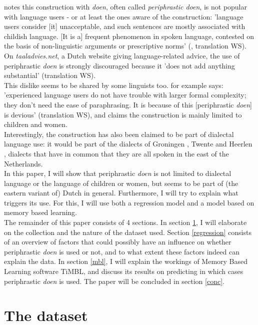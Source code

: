 \documentclass[12pt]{article}
\begin{document}
\citet{g83} notes this construction with \emph{doen}, often called \emph{periphrastic doen}, is not popular with language users - or at least the ones aware of the construction: 'language users consider [it] unacceptable, and such sentences are mostly associated with childish language. [It is a] frequent phenomenon in spoken language, contested on the basis of non-linguistic arguments or prescriptive norms' (\citealp[p. 58]{g83}, translation WS). On \emph{taaladvies.net}, a Dutch website giving language-related advice, the use of periphrastic \emph{doen} is strongly discouraged because it 'does not add anything substantial' (translation WS).\\\indent
This dislike seems to be shared by some linguists too. \citet[p. 121]{d94} for example says: 'experienced language users do not have trouble with larger formal complexity; they don't need the ease of paraphrasing. It is because of this [periphrastic \emph{doen}] is devious' (translation WS), and \citet[p. 153]{n62} claims the construction is mainly limited to children and women.\\\indent
Interestingly, the construction has also been claimed to be part of dialectal language use: it would be part of the dialects of Groningen \citep{tl53}, Twente \citep{n62} and Heerlen \citep{c94}, dialects that have in common that they are all spoken in the east of the Netherlands.\\\indent
In this paper, I will show that periphrastic \emph{doen} is not limited to dialectal language or the language of children or women,  but seems to be part of (the eastern variant of) Dutch in general. Furthermore, I will try to explain what triggers its use. For this, I will use both a regression model and a model based on memory based learning.\\\indent
The remainder of this paper consists of 4 sections. In section \ref{data}, I will elaborate on the collection and the nature of the dataset used. Section \ref{regression} consists of an overview of factors that could possibly have an influence on whether periphrastic \emph{doen} is used or not, and to what extent these factors indeed can explain the data. In section \ref{mbl}, I will explain the workings of Memory Based Learning software TiMBL, and discuss its results on predicting in which cases periphrastic \emph{doen} is used. The paper will be concluded in section \ref{conc}.

\section{The dataset} \label{data}
\end{document}
